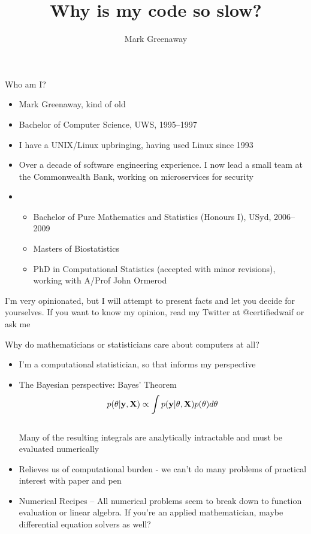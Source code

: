 \documentclass{beamer}
\title{Why is my code so slow?}
\author{Mark Greenaway}
\begin{document}
\begin{frame}
	\maketitle
\end{frame}

\begin{frame}{Who am I?}
	\begin{itemize}
		\item Mark Greenaway, kind of old
		\item Bachelor of Computer Science, UWS, 1995--1997
		\item I have a UNIX/Linux upbringing, having used Linux since 1993
		\item Over a decade of software engineering experience. I now lead a small team at the Commonwealth Bank, working on microservices for security
		\item
			\begin{itemize}
				\item Bachelor of Pure Mathematics and Statistics (Honours I), USyd, 2006--2009
				\item Masters of Biostatistics
				\item PhD in Computational Statistics (accepted with minor revisions), working with A/Prof John Ormerod
			\end{itemize}
	\end{itemize}
	I'm very opinionated, but I will attempt to present facts and let you decide for yourselves. If you want to know my opinion, read my Twitter at @certifiedwaif or ask me
\end{frame}

\begin{frame}{Why do mathematicians or statisticians care about computers at all?}
	\begin{itemize}
		\item I'm a computational statistician, so that informs my perspective
		\item The Bayesian perspective: Bayes' Theorem
			$$p({\bf \theta}|{\bf y}, {\bf X}) \propto \int p({\bf y}|{\bf \theta}, {\bf X}) p({\bf \theta}) d {\bf \theta}$$ \\
			Many of the resulting integrals are analytically intractable and must be evaluated numerically
		\item Relieves us of computational burden - we can't do many problems of practical interest with paper and pen
		\item{Numerical Recipes} -- All numerical problems seem to break down to function evaluation or linear algebra. If you're an applied mathematician, maybe differential equation solvers as well? 
	\end{itemize}
\end{frame}
\end{document}
